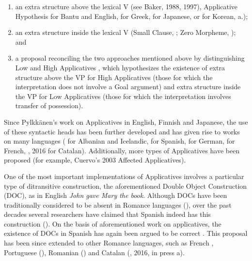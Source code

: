 \documentclass[output=paper,modfonts,nonflat,colorlinks,citecolor=brown]{langsci/langscibook}
\begin{document}
\begin{enumerate}
\item 
an extra structure above the lexical V (see Baker, 1988, 1997),  Applicative Hypothesis for Bantu and English, \citet{Anagnostopoulou2003} for Greek, \citet{MiyagawaTsujioka2004} for Japanese, or \citet{MiyagawaJung2004} for Korean, a.); 

\item 
 an extra structure inside the lexical V (Small Clause, \citealt{Kayne1984}; Zero Morpheme, \citealt{Pesetsky1995}); and

\item 
a proposal reconciling the two approaches mentioned above by distinguishing Low and High Applicatives \citep{Pylkkänen2002}, which hypothesizes the existence of extra structure above the VP for High Applicatives (those for which the interpretation does not involve a Goal argument) and extra structure inside the VP for Low Applicatives (those for which the interpretation involves transfer of possession). 

\end{enumerate}
 
{Since Pylkkänen's work on Applicatives in English, Finnish and Japanese, the use of these syntactic heads has been further developed and has given rise to works on many languages (\citealt{McGinnis2001} for Albanian and Icelandic, \citealt{Cuervo2003} for Spanish, \citealt{McIntyre2006} for German, \citealt{Fournier2010} for French, \citealt{Pineda2013}, 2016 for Catalan). Additionally, more types of Applicatives have been proposed (for example, Cuervo’s 2003 Affected Applicatives).~}


 
{One of the most important implementations of Applicatives involves a particular type of ditransitive construction, the aforementioned Double Object Construction (DOC), as in English} {\textit{John gave Mary the book}}{. Although DOCs have been traditionally considered to be absent in Romance languages (\citealt{Kayne1984,HolmbergPlatzack1995}), over the past decades several researchers have claimed that Spanish indeed has this construction (\citealt{Masullo1992,Demonte1995,Romero1997,Bleam2003}). On the basis of  aforementioned work on applicatives, the existence of DOCs in Spanish has again been argued to be correct \citep{Cuervo2003}. This proposal has been since extended to other Romance languages, such as French \citep{Fournier2010}, Portuguese (\citealt{TorresMoraisSalles2010}), Romanian (\citealt{DiaconescuRivero2007}) and Catalan (\citealt{Pineda2013}, 2016, in press a).} 
\end{document}
